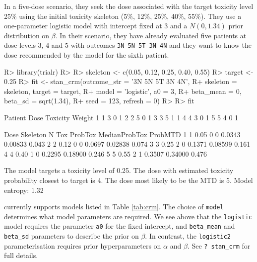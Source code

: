 \documentclass[article]{jss}
\begin{document}
In a five-dose scenario, they seek the dose associated with the target
toxicity level 25\% using the initial toxicity skeleton (5\%, 12\%,
25\%, 40\%, 55\%). They use a one-parameter logistic model with
intercept fixed at 3 and a \(N(0, 1.34)\) prior distribution on
\(\beta\). In their scenario, they have already evaluated five patients
at dose-levels 3, 4 and 5 with outcomes \texttt{3N\ 5N\ 5T\ 3N\ 4N} and
they want to know the dose recommended by the model for the sixth
patient.

\begin{CodeChunk}

\begin{CodeInput}
R> library(trialr)
R> 
R> skeleton <- c(0.05, 0.12, 0.25, 0.40, 0.55)
R> target <- 0.25
R> fit <- stan_crm(outcome_str = '3N 5N 5T 3N 4N',
R+                 skeleton = skeleton, target = target,
R+                 model = 'logistic', a0 = 3,
R+                 beta_mean = 0, beta_sd = sqrt(1.34),
R+                 seed = 123, refresh = 0)
R> 
R> fit
\end{CodeInput}

\begin{CodeOutput}
  Patient Dose Toxicity Weight
1       1    3        0      1
2       2    5        0      1
3       3    5        1      1
4       4    3        0      1
5       5    4        0      1

  Dose Skeleton N Tox ProbTox MedianProbTox ProbMTD
1    1     0.05 0   0  0.0343       0.00833   0.043
2    2     0.12 0   0  0.0697       0.02838   0.074
3    3     0.25 2   0  0.1371       0.08599   0.161
4    4     0.40 1   0  0.2295       0.18900   0.246
5    5     0.55 2   1  0.3507       0.34000   0.476

The model targets a toxicity level of 0.25.
The dose with estimated toxicity probability closest to target is 4.
The dose most likely to be the MTD is 5.
Model entropy: 1.32
\end{CodeOutput}
\end{CodeChunk}

 currently supports models listed in Table \ref{tab:crm}.
The choice of \texttt{model} determines what model parameters are
required. We see above that the \texttt{logistic} model requires the
parameter \texttt{a0} for the fixed intercept, and \texttt{beta\_mean}
and \texttt{beta\_sd} parameters to describe the prior on \(\beta\). In
contrast, the \texttt{logistic2} parameterisation requires prior
hyperparameters on \(\alpha\) and \(\beta\). See \texttt{?\ stan\_crm}
for full details.
\end{document}
